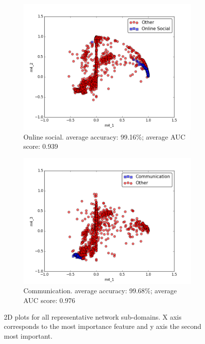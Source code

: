 \documentclass{article}
\begin{document}
\begin{figure}[H]
\medskip
\begin{subfigure}{0.48\textwidth}
\includegraphics[width=\linewidth]{figs/one_by_many/online_social/2d.png}
\caption{Online social. average accuracy: 99.16\%; average AUC score: 0.939} \label{online_social_2d}
\end{subfigure}\hspace*{\fill}
\begin{subfigure}{0.48\textwidth}
\includegraphics[width=\linewidth]{figs/one_by_many/communication/2d.png}
\caption{Communication. average accuracy: 99.68\%; average AUC score: 0.976} \label{communication_2d}
\end{subfigure}

\caption{2D plots for all representative network sub-domains. X axis corresponds to the most importance feature and y axis the second most important.} \label{2d_figures}
\end{figure}
\end{document}
